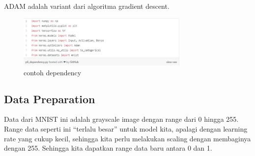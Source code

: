 ADAM adalah variant dari algoritma gradient descent.
\begin{figure}[!htp]
	\includegraphics[width=0.75\textwidth]{figures/Dependency.JPG}
	\caption{contoh dependency}
	\label{labelgambar}
\end{figure}

\subsection{Data Preparation}
Data dari MNIST ini adalah grayscale image dengan range dari 0 hingga 255. Range data seperti ini “terlalu besar” untuk model kita, apalagi dengan learning rate yang cukup kecil, sehingga kita perlu melakukan scaling dengan membaginya dengan 255. Sehingga kita dapatkan range data baru antara 0 dan 1.


